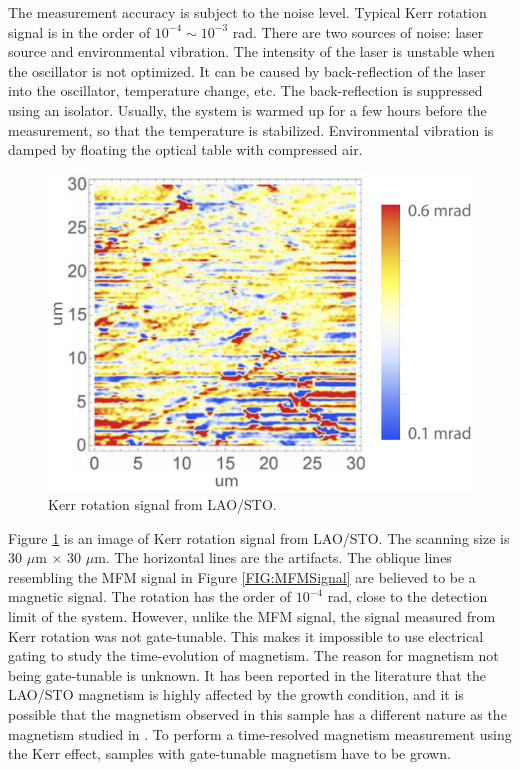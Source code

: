\documentclass[pdflatex, sectionletters, 12pt]{pittetd}    %
\begin{document}
The measurement accuracy is subject to the noise level. Typical Kerr rotation signal is in the order of $10^{-4} \sim 10^{-3}$ rad. There are two sources of noise: laser source and environmental vibration. The intensity of the laser is unstable when the oscillator is not optimized. It can be caused by back-reflection of the laser into the oscillator, temperature change, etc. The back-reflection is suppressed using an isolator. Usually, the system is warmed up for a few hours before the measurement, so that the temperature is stabilized. Environmental vibration is damped by floating the optical table with compressed air.
\\

\begin{figure}[h!]
	\centering
	\includegraphics[width=.6\textwidth]{Drawing/KerrLAOSTO.pdf}
	\caption{Kerr rotation signal from LAO/STO.}
	\label{FIG:KerrLAOSTO}
\end{figure}

Figure \ref{FIG:KerrLAOSTO} is an image of Kerr rotation signal from LAO/STO. The scanning size is 30 $\mu$m $\times$ 30 $\mu$m. The horizontal lines are the artifacts. The oblique lines resembling the MFM signal in Figure \ref{FIG:MFMSignal} are believed to be a magnetic signal. The rotation has the order of $10^{-4}$ rad, close to the detection limit of the system. However, unlike the MFM signal, the signal measured from Kerr rotation was not gate-tunable. This makes it impossible to use electrical gating to study the time-evolution of magnetism. The reason for magnetism not being gate-tunable is unknown. It has been reported in the literature that the LAO/STO magnetism is highly affected by the growth condition\cite{ariando2011electronic, salluzzo2013origin, huijben2009structure, liu2014dominant}, and it is possible that the magnetism observed in this sample has a different nature as the magnetism studied in \cite{bi2014room}. To perform a time-resolved magnetism measurement using the Kerr effect, samples with gate-tunable magnetism have to be grown.
\end{document}
